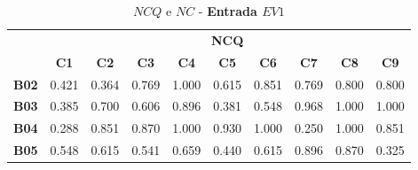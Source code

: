 \begin{table}[htbp]
	\centering
	\caption{$NCQ$ e $NC$ - \textbf{Entrada $EV1$}}
	\begin{tabular}{|c|ccccccccc|}
		\hline
		\rowcolor[HTML]{D0CECE} 
		\cellcolor[HTML]{D0CECE} & \multicolumn{9}{c|}{\cellcolor[HTML]{D0CECE}\textbf{NCQ}} \\ \cline{2-10} 
		\rowcolor[HTML]{D0CECE} 
		\multirow{-2}{*}{\cellcolor[HTML]{D0CECE}\textbf{Part.}} & \multicolumn{1}{c|}{\cellcolor[HTML]{D0CECE}\textbf{C1}} & \multicolumn{1}{c|}{\cellcolor[HTML]{D0CECE}\textbf{C2}} & \multicolumn{1}{c|}{\cellcolor[HTML]{D0CECE}\textbf{C3}} & \multicolumn{1}{c|}{\cellcolor[HTML]{D0CECE}\textbf{C4}} & \multicolumn{1}{c|}{\cellcolor[HTML]{D0CECE}\textbf{C5}} & \multicolumn{1}{c|}{\cellcolor[HTML]{D0CECE}\textbf{C6}} & \multicolumn{1}{c|}{\cellcolor[HTML]{D0CECE}\textbf{C7}} & \multicolumn{1}{c|}{\cellcolor[HTML]{D0CECE}\textbf{C8}} & \textbf{C9} \\ \hline
		\textbf{B02} & \multicolumn{1}{c|}{0.421} & \multicolumn{1}{c|}{0.364} & \multicolumn{1}{c|}{0.769} & \multicolumn{1}{c|}{1.000} & \multicolumn{1}{c|}{0.615} & \multicolumn{1}{c|}{0.851} & \multicolumn{1}{c|}{0.769} & \multicolumn{1}{c|}{0.800} & 0.800 \\ \hline
		\rowcolor[HTML]{F2F2F2} 
		\textbf{B03} & \multicolumn{1}{c|}{\cellcolor[HTML]{F2F2F2}0.385} & \multicolumn{1}{c|}{\cellcolor[HTML]{F2F2F2}0.700} & \multicolumn{1}{c|}{\cellcolor[HTML]{F2F2F2}0.606} & \multicolumn{1}{c|}{\cellcolor[HTML]{F2F2F2}0.896} & \multicolumn{1}{c|}{\cellcolor[HTML]{F2F2F2}0.381} & \multicolumn{1}{c|}{\cellcolor[HTML]{F2F2F2}0.548} & \multicolumn{1}{c|}{\cellcolor[HTML]{F2F2F2}0.968} & \multicolumn{1}{c|}{\cellcolor[HTML]{F2F2F2}1.000} & 1.000 \\ \hline
		\textbf{B04} & \multicolumn{1}{c|}{0.288} & \multicolumn{1}{c|}{0.851} & \multicolumn{1}{c|}{0.870} & \multicolumn{1}{c|}{1.000} & \multicolumn{1}{c|}{0.930} & \multicolumn{1}{c|}{1.000} & \multicolumn{1}{c|}{0.250} & \multicolumn{1}{c|}{1.000} & 0.851 \\ \hline
		\rowcolor[HTML]{F2F2F2} 
		\textbf{B05} & \multicolumn{1}{c|}{\cellcolor[HTML]{F2F2F2}0.548} & \multicolumn{1}{c|}{\cellcolor[HTML]{F2F2F2}0.615} & \multicolumn{1}{c|}{\cellcolor[HTML]{F2F2F2}0.541} & \multicolumn{1}{c|}{\cellcolor[HTML]{F2F2F2}0.659} & \multicolumn{1}{c|}{\cellcolor[HTML]{F2F2F2}0.440} & \multicolumn{1}{c|}{\cellcolor[HTML]{F2F2F2}0.615} & \multicolumn{1}{c|}{\cellcolor[HTML]{F2F2F2}0.896} & \multicolumn{1}{c|}{\cellcolor[HTML]{F2F2F2}0.870} & 0.325 \\ \hline

\end{tabular}
\end{table}
